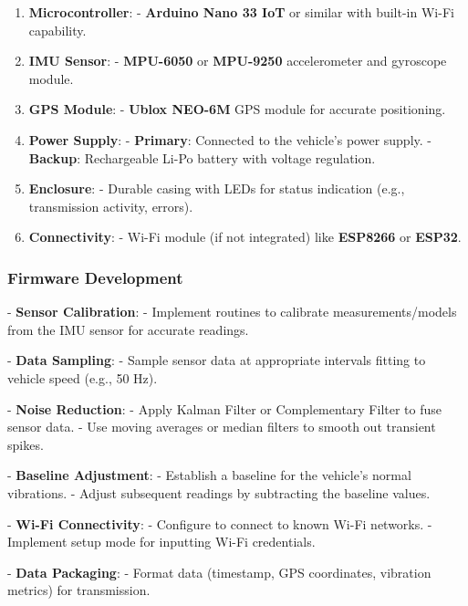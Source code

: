 \documentclass[12pt,a4paper]{article}
\begin{document}
\begin{enumerate}
\item \textbf{Microcontroller}:
   - \textbf{Arduino Nano 33 IoT} or similar with built-in Wi-Fi capability.

\item \textbf{IMU Sensor}:
   - \textbf{MPU-6050} or \textbf{MPU-9250} accelerometer and gyroscope module.

\item \textbf{GPS Module}:
   - \textbf{Ublox NEO-6M} GPS module for accurate positioning.

\item \textbf{Power Supply}:
   - \textbf{Primary}: Connected to the vehicle's power supply.
   - \textbf{Backup}: Rechargeable Li-Po battery with voltage regulation.

\item \textbf{Enclosure}:
   - Durable casing with LEDs for status indication (e.g., transmission activity, errors).

\item \textbf{Connectivity}:
   - Wi-Fi module (if not integrated) like \textbf{ESP8266} or \textbf{ESP32}.
\end{enumerate}

\subsubsection*{Firmware Development}

- \textbf{Sensor Calibration}:
  - Implement routines to calibrate measurements/models from the IMU sensor for accurate readings.

- \textbf{Data Sampling}:
  - Sample sensor data at appropriate intervals fitting to vehicle speed (e.g., 50 Hz).

- \textbf{Noise Reduction}:
  - Apply Kalman Filter or Complementary Filter to fuse sensor data.
  - Use moving averages or median filters to smooth out transient spikes.

- \textbf{Baseline Adjustment}:
  - Establish a baseline for the vehicle's normal vibrations.
  - Adjust subsequent readings by subtracting the baseline values.

- \textbf{Wi-Fi Connectivity}:
  - Configure to connect to known Wi-Fi networks.
  - Implement setup mode for inputting Wi-Fi credentials.

- \textbf{Data Packaging}:
  - Format data (timestamp, GPS coordinates, vibration metrics) for transmission.
\end{document}
